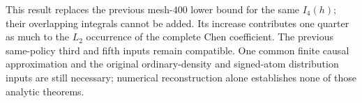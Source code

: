 This result replaces the previous mesh-$400$ lower bound for the
same $I_4(h)$; their overlapping integrals cannot be added. Its
increase contributes one quarter as much to the $L_2$ occurrence
of the complete Chen coefficient. The previous same-policy third
and fifth inputs remain compatible. One common finite causal
approximation and the original ordinary-density and signed-atom
distribution inputs are still necessary; numerical reconstruction
alone establishes none of those analytic theorems.
